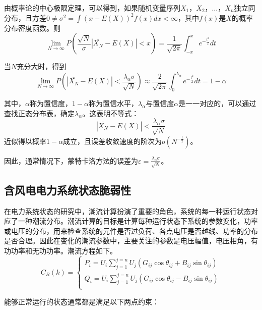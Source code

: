 由概率论的中心极限定理，可以得到，如果随机变量序列$X_1$，$X_2$，$\dots$，$X_n$独立同分布，且方差$0\neq\sigma^{2}=\int(x-E(X))^{2}f(x)dx<\infty$，其中$f(x)$是$X$的概率分布密度函数。则
\begin{equation}
\label{equ:chap3:Index6}
\lim_{N\to\infty}P\left(\frac{\sqrt{N}}{\sigma}|\overline{X_N}-E(X)|<x\right)=\frac{1}{\sqrt{2\pi}}\int_{-x}^{x}e^{-\frac{t^{2}}{2}}dt
\end{equation}

当$N$充分大时，得到
\begin{equation}
\label{equ:chap3:Index7}
\lim_{N\to\infty}P\left(|\overline{X_N}-E(X)|<\frac{\lambda_\alpha\sigma}{\sqrt{N}}\right)\approx\frac{2}{\sqrt{2\pi}}\int_{0}^{\lambda_{\alpha}}e^{-\frac{t^{2}}{2}}dt=1-\alpha
\end{equation}

其中，$\alpha$称为置信度，$1-\alpha$称为置信水平，$\lambda_\alpha$与置信度$\alpha$是一一对应的，可以通过查找正态分布表，确定$\lambda_\alpha$。这表明不等式：
\begin{equation}
\label{equ:chap3:Index8}
|\overline{X_N}-E(X)|<\frac{\lambda_\alpha\sigma}{\sqrt{N}}
\end{equation}
近似得以概率$1-\alpha$成立，且误差收敛速度的阶次为$o(N^{-\frac{1}{2}})$。

因此，通常情况下，蒙特卡洛方法的误差为$\varepsilon=\displaystyle{\frac{\lambda_\alpha\sigma}{\sqrt{N}}}$。

\subsection{含风电电力系统状态脆弱性}
\label{sec:static}
在电力系统状态的研究中，潮流计算扮演了重要的角色，系统的每一种运行状态对应了一种潮流分布。潮流计算的目标是计算每种运行状态下系统的参数变化，功率或电压的分布，用来检查系统的元件是否过负荷、各点电压是否越线、功率的分布是否合理。因此在变化的潮流参数中，主要关注的参数是电压幅值，电压相角，有功功率和无功功率。潮流方程如下。
\begin{equation}\label{equ:chap3:Index9}
C_B(k)= \begin{cases}
        P_i=U_i\sum_{j=1}^{j=n}U_j(G_{ij}\cos\theta_{ij}+B_{ij}\sin\theta_{ij})\\
        Q_i=U_i\sum_{j=1}^{j=n}U_j(G_{ij}\cos\theta_{ij}-B_{ij}\sin\theta_{ij})\\
      \end{cases}
\end{equation}

能够正常运行的状态通常都是满足以下两点约束：

